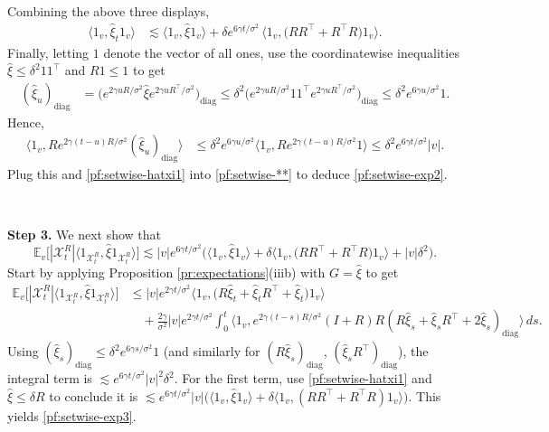 \documentclass[11pt,reqno]{amsart}
\numberwithin{equation}{section}
\theoremstyle{definition}
\def\E{{\mathbb E}}
\def\X{{\mathcal X}}
\begin{document}
Combining the above three displays, 
\begin{align}
	\langle 1_v,\widehat{\xi}_t 1_v\rangle
	&\lesssim
	\langle 1_v,\widehat{\xi}  1_v\rangle
	+
	\delta e^{6\gamma t/\sigma^2}\,
	\big\langle 1_v,\big(RR^\top + R^\top R\big) 1_v \big\rangle. \label{pf:setwise-hatxi1}
\end{align}
Finally, letting $1$ denote the vector of all ones, use the coordinatewise inequalities $\widehat{\xi} \le \delta^2 1 1^\top$ and $R 1\le 1$ to get
\begin{align*}
	(\widehat{\xi}_u)_{\mathrm{diag}}
	&= \big( e^{2\gamma u R/\sigma^2} \widehat{\xi} e^{2\gamma uR^\top/\sigma^2} \big)_{\mathrm{diag}}
	\le \delta^2 \big( e^{2\gamma u R/\sigma^2} 11^\top e^{2\gamma uR^\top/\sigma^2} \big)_{\mathrm{diag}}
	\le \delta^2 e^{6\gamma u/\sigma^2} 1. 
\end{align*}
Hence,
\begin{align*}
	\big\langle 1_v, R e^{2\gamma (t-u)R/\sigma^2} (\widehat{\xi}_u)_{\mathrm{diag}}\big\rangle
	&\le  \delta^2 e^{6\gamma u/\sigma^2} \big\langle 1_v, R e^{2\gamma (t-u)R/\sigma^2} 1\big\rangle
	\le \delta^2 e^{6\gamma t/\sigma^2} |v|.
\end{align*}
Plug this and \eqref{pf:setwise-hatxi1} into \eqref{pf:setwise-**} to deduce \eqref{pf:setwise-exp2}.

{ \ }

\noindent\textbf{Step 3.}
We next show that
\begin{equation}
	\E_v\big[|\X_t^{R}|  \langle 1_{\X_t^{R}}, \widehat{\xi} 1_{\X_t^{R}}\rangle  \big] \lesssim  |v| e^{6\gamma t/\sigma^2} \Big(\langle 1_v,\widehat{\xi}  1_v\rangle + \delta \big\langle 1_v,\big(RR^\top + R^\top R\big) 1_v \big\rangle + |v|\delta^2\Big). \label{pf:setwise-exp3}
\end{equation}
Start by applying Proposition \ref{pr:expectations}(iiib) with $G=\widehat{\xi}$ to get 
\begin{equation}
	\begin{split}
		\E_v\big[ |\X_t^{R}| \langle 1_{\X_t^{R}}, \widehat{\xi} 1_{\X_t^{R}}\rangle  \big]
		&\le |v| e^{2\gamma t/\sigma^2} \Big\langle 1_v,\Big(  R \widehat{\xi}_t +  \widehat{\xi}_tR^\top + \widehat{\xi}_t\Big) 1_v\Big\rangle   \\
		&\quad + \frac{2\gamma}{\sigma^2} |v| e^{2\gamma t/\sigma^2} \int_0^t  \langle 1_v,e^{2\gamma (t-s)  R /\sigma^2}(I+R)R(R \widehat{\xi}_s + \widehat{\xi}_sR^\top + 2\widehat{\xi}_s)_{\mathrm{diag}}\rangle   \,ds .
	\end{split} \label{pf:setwise-exp3-1}
\end{equation}
Using $(\widehat{\xi}_s)_{\mathrm{diag}} \le \delta^2 e^{6\gamma s/\sigma^2}1$ (and similarly for $(R\widehat{\xi}_s)_{\mathrm{diag}}$, $(\widehat{\xi}_sR^\top)_{\mathrm{diag}}$), the integral term is $\lesssim e^{6\gamma t/\sigma^2}|v|^2\delta^2$.
For the first term, use \eqref{pf:setwise-hatxi1} and $\widehat{\xi} \le \delta R$ to conclude it is $\lesssim e^{6\gamma t/\sigma^2}|v|\big(\langle 1_v,\widehat{\xi}1_v\rangle+\delta\langle 1_v,(R R^\top+R^\top R)1_v\rangle\big)$.
This yields \eqref{pf:setwise-exp3}.
\end{document}

